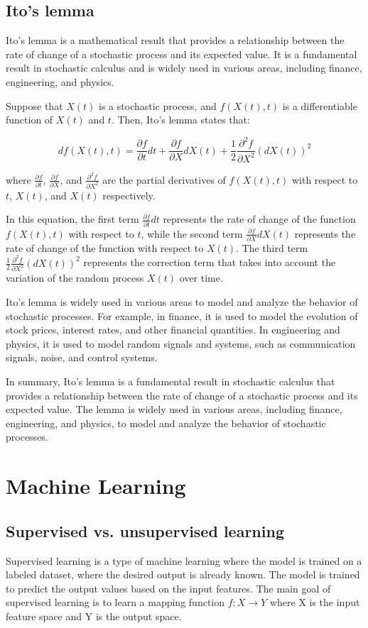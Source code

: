 \documentclass[12pt, a4paper, oneside]{article}
\begin{document}
\subsection{ Ito’s lemma}
Ito's lemma is a mathematical result that provides a relationship between the rate of change of a stochastic process and its expected value. It is a fundamental result in stochastic calculus and is widely used in various areas, including finance, engineering, and physics.

Suppose that $X(t)$ is a stochastic process, and $f(X(t),t)$ is a differentiable function of $X(t)$ and $t$. Then, Ito's lemma states that:

$$ df(X(t),t) = \frac{\partial f}{\partial t}dt + \frac{\partial f}{\partial X}dX(t) + \frac{1}{2}\frac{\partial^2 f}{\partial X^2}(dX(t))^2 $$

where $\frac{\partial f}{\partial t}$, $\frac{\partial f}{\partial X}$, and $\frac{\partial^2 f}{\partial X^2}$ are the partial derivatives of $f(X(t),t)$ with respect to $t$, $X(t)$, and $X(t)$ respectively.

In this equation, the first term $\frac{\partial f}{\partial t}dt$ represents the rate of change of the function $f(X(t),t)$ with respect to $t$, while the second term $\frac{\partial f}{\partial X}dX(t)$ represents the rate of change of the function with respect to $X(t)$. The third term $\frac{1}{2}\frac{\partial^2 f}{\partial X^2}(dX(t))^2$ represents the correction term that takes into account the variation of the random process $X(t)$ over time.

Ito's lemma is widely used in various areas to model and analyze the behavior of stochastic processes. For example, in finance, it is used to model the evolution of stock prices, interest rates, and other financial quantities. In engineering and physics, it is used to model random signals and systems, such as communication signals, noise, and control systems.

In summary, Ito's lemma is a fundamental result in stochastic calculus that provides a relationship between the rate of change of a stochastic process and its expected value. The lemma is widely used in various areas, including finance, engineering, and physics, to model and analyze the behavior of stochastic processes.
\section{Machine Learning}
\subsection{ Supervised vs. unsupervised learning }
Supervised learning is a type of machine learning where the model is trained on a labeled dataset, where the desired output is already known. The model is trained to predict the output values based on the input features. The main goal of supervised learning is to learn a mapping function $f: X \rightarrow Y$ where X is the input feature space and Y is the output space.
\end{document}
